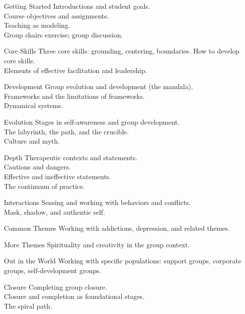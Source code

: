 \documentclass[letterpaper,10pt,headsepline]{scrreprt}
\begin{document}
\begin{compactdesc}

\item[Getting Started] Introductions and student goals.\\
Course objectives and assignments.\\
Teaching as modeling.\\
Group chairs exercise; group discussion.
\item[Core Skills] Three core skills: grounding, centering, boundaries. How to develop core skills.\\ 
Elements of effective facilitation and leadership.
\item[Development] Group evolution and development (the mandala).\\
Frameworks and the limitations of frameworks.\\ Dynamical systems.
\item[Evolution] Stages in self-awareness and group development.\\
The labyrinth, the path, and the crucible.\\ Culture and myth. 
\item[Depth] Therapeutic contexts and statements.\\ Cautions and dangers.\\
Effective and ineffective statements.\\
The continuum of practice.
\item[Interactions] Sensing and working with behaviors and conflicts.\\
Mask, shadow, and authentic self.
\item[Common Themes] Working with addictions, depression, and related themes.
\item[More Themes] Spirituality and creativity in the group context.
\item[Out in the World] Working with specific populations: support groups, corporate groups, self-development groups.
\item[Closure] Completing group closure.\\ Closure and completion as foundational stages.\\ The spiral path.
\end{compactdesc}
\end{document}
